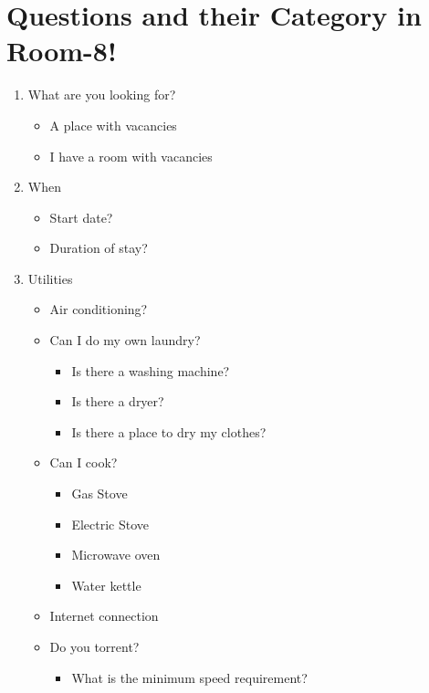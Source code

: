 \documentclass[journal]{./IEEE/IEEEtran}
\begin{document}
\section{Questions and their Category in Room-8!}
\begin{enumerate}

    \item What are you looking for?
    \begin{itemize}
        \item A place with vacancies
        \item I have a room with vacancies
    \end{itemize}

    \item When
    \begin{itemize}
        \item Start date?
        \item Duration of stay?
    \end{itemize}

    \item Utilities
    \begin{itemize}
        \item Air conditioning?
        \item Can I do my own laundry?
        \begin{itemize}
            \item Is there a washing machine?
            \item Is there a dryer?
            \item Is there a place to dry my clothes?
        \end{itemize}
        \item Can I cook?
        \begin{itemize}
            \item Gas Stove
            \item Electric Stove
            \item Microwave oven
            \item Water kettle
        \end{itemize}
        \item Internet connection
        \item Do you torrent?
        \begin{itemize}
            \item What is the minimum speed requirement?
        \end{itemize}
    \end{itemize}


\end{enumerate}
\end{document}
